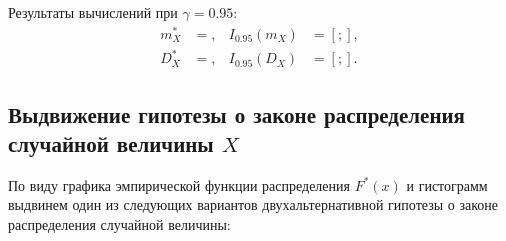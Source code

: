 \documentclass[14pt,hidelinks]{extarticle}
\begin{document}
Результаты вычислений при $ \gamma = 0.95 $:
\begin{equation*}
	\begin{aligned}
		m^*_X &= , &
		I_{0.95}(m_X) &= \left[ ;  \right], \\
		D^*_X &= , &
                I_{0.95}(D_X) &= \left[ ;  \right].
	\end{aligned}
\end{equation*}

\newpage

\subsection{Выдвижение гипотезы о законе распределения случайной величины $ X $}
По виду графика эмпирической функции распределения $F^*(x)$ и гистограмм выдвинем один из следующих вариантов двухальтернативной
гипотезы о законе распределения случайной величины:
\end{document}
